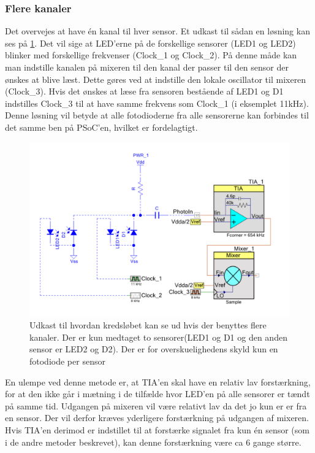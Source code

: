 \documentclass[HardwareDesign/HardwareDesign_main.tex]{subfiles}
\begin{document}
\subsubsection{Flere kanaler}
Det overvejes at have én kanal til hver sensor. Et udkast til sådan en løsning kan ses på \ref{fig:multiple_channels}. Det vil sige at LED'erne på de forskellige sensorer (LED1 og LED2) blinker med forskellige frekvenser (Clock\_1 og Clock\_2). På denne måde kan man indstille kanalen på mixeren til den kanal der passer til den sensor der ønskes at blive læst. Dette gøres ved at indstille den lokale oscillator til mixeren (Clock\_3). Hvis det ønskes at læse fra sensoren bestående af LED1 og D1 indstilles Clock\_3 til at have samme frekvens som Clock\_1 (i eksemplet 11kHz). Denne løsning vil betyde at alle fotodioderne fra alle sensorerne kan forbindes til det samme ben på PSoC'en, hvilket er fordelagtigt.

\begin{figure}[H]
    \centering
    \includegraphics[width=1\textwidth]{HardwareDesign/CupSensor/graphics/Flere_kanaler.PNG}
    \caption{Udkast til hvordan kredsløbet kan se ud hvis der benyttes flere kanaler. Der er kun medtaget to sensorer(LED1 og D1 og den anden sensor er LED2 og D2). Der er for overskuelighedens skyld kun en fotodiode per sensor}
    \label{fig:multiple_channels}
\end{figure}

 En ulempe ved denne metode er, at TIA'en skal have en relativ lav forstærkning, for at den ikke går i mætning i de tilfælde hvor LED'en på alle sensorer er tændt på samme tid. Udgangen på mixeren vil være relativt lav da det jo kun er er fra en sensor. Der vil derfor kræves yderligere forstærkning på udgangen af mixeren. Hvis TIA'en derimod er indstillet til at forstærke signalet fra kun én sensor (som i de andre metoder beskrevet), kan denne forstærkning være ca 6 gange større.
 
\end{document}
